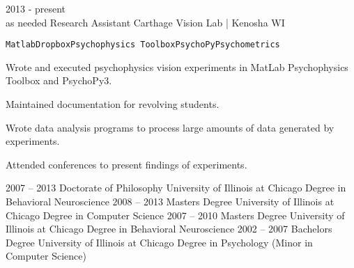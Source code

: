 \documentclass[9pt]{developercv} %
\begin{document}
\begin{entrylist}
	\entry
		{2013 - present \\\footnotesize{as needed}}
		{Research Assistant}
		{Carthage Vision Lab | Kenosha WI}
		{
		\texttt{Matlab}\slashsep\texttt{Dropbox}\slashsep\texttt{Psychophysics Toolbox}\slashsep\texttt{PsychoPy}\slashsep\texttt{Psychometrics}
		 \begin{compactitem}
		 \item Wrote and executed psychophysics vision experiments in MatLab Psychophysics Toolbox and PsychoPy3. 
		 \item Maintained documentation for revolving students. 
		 \item Wrote data analysis programs to process large amounts of data generated by experiments. 
		 \item Attended conferences to present findings of experiments. 
		 \end{compactitem}		
		}
\end{entrylist}



\begin{entrylist}
	\entry
		{2007 -- 2013}
		{Doctorate of Philosophy}
		{University of Illinois at Chicago}
		{Degree in Behavioral Neuroscience}
	\entry
		{2008 -- 2013}
		{Masters Degree}
		{University of Illinois at Chicago}
		{Degree in Computer Science}
	\entry
		{2007 -- 2010}
		{Masters Degree}
		{University of Illinois at Chicago}
		{Degree in Behavioral Neuroscience}
	\entry
		{2002 -- 2007}
		{Bachelors Degree}
		{University of Illinois at Chicago}
		{Degree in Psychology (Minor in Computer Science)}
\end{entrylist}

\end{document}
